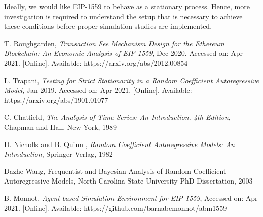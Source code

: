 \documentclass[peerreview]{ieeesyscoin}
\begin{document}
Ideally, we would like EIP-1559 to behave as a stationary process. Hence, more investigation is required to understand the setup that is necessary to achieve these conditions before proper simulation studies are implemented.

\begin{thebibliography}{00}

 T. Roughgarden, \textit{Transaction Fee Mechanism Design for the Ethereum Blockchain: An Economic Analysis of EIP-1559}, Dec 2020. Accessed on: Apr 2021. [Online]. Available: https://arxiv.org/abs/2012.00854

 L. Trapani, \textit{Testing for Strict Stationarity in a Random Coefficient Autoregressive Model}, Jan 2019. Accessed on: Apr 2021. [Online]. Available: https://arxiv.org/abs/1901.01077

 C. Chatfield, \textit{The Analysis of Time Series: An Introduction. 4th Edition}, Chapman and Hall, New York, 1989

 D. Nicholls and B. Quinn , \textit{Random Coefficient Autoregressive Models: An Introduction}, Springer-Verlag, 1982

 Dazhe Wang, Frequentist and Bayesian Analysis of Random Coefficient Autoregressive Models, North Carolina State University PhD Dissertation, 2003

 B. Monnot, \textit{Agent-based Simulation Environment for EIP 1559}, Accessed on: Apr 2021.  [Online]. Available:  https://github.com/barnabemonnot/abm1559

\end{thebibliography}


\EOD
\end{document}
